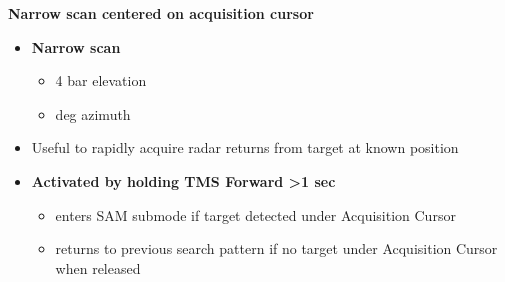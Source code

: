 \begin{tcoloritemize}
{    \textbf{Narrow scan centered on acquisition cursor}
    \begin{itemize}
        \item \textbf{Narrow scan}
        \begin{itemize}
            \item 4 bar elevation 
            \item {} deg azimuth
        \end{itemize}
        \item Useful to rapidly acquire radar returns from target at known position
        \item \textbf{Activated by holding TMS Forward >1 sec}
        \begin{itemize}
            \item enters SAM submode if target detected under Acquisition Cursor
            \item returns to previous search pattern if no target under Acquisition Cursor when released
        \end{itemize}
    \end{itemize}}
\end{tcoloritemize}

